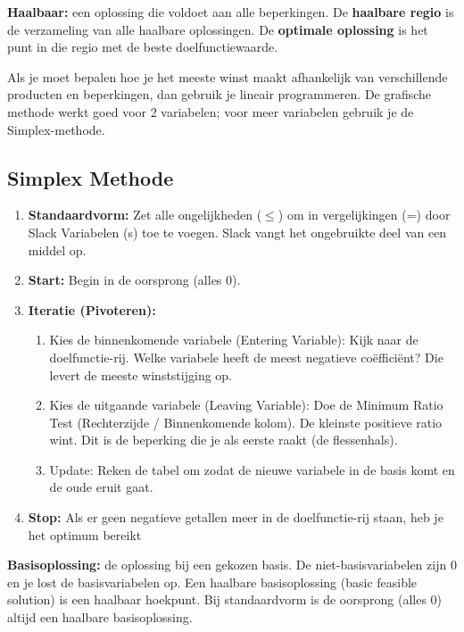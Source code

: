 \documentclass[a4paper,11pt]{article}
\begin{document}
\textbf{Haalbaar:} een oplossing die voldoet aan alle beperkingen. De \textbf{haalbare regio} is de verzameling van alle haalbare oplossingen. De \textbf{optimale oplossing} is het punt in die regio met de beste doelfunctiewaarde.

Als je moet bepalen hoe je het meeste winst
maakt afhankelijk van verschillende producten en beperkingen,
dan gebruik je lineair programmeren. De grafische methode werkt goed voor 2 variabelen;
voor meer variabelen gebruik je de Simplex-methode.

\subsection{Simplex Methode}

\begin{enumerate}
    \item \textbf{Standaardvorm:} Zet alle ongelijkheden ($\leq$) om in vergelijkingen (=) door Slack Variabelen (s) toe te voegen.
          Slack vangt het ongebruikte deel van een middel op.
    \item \textbf{Start:} Begin in de oorsprong (alles 0).
    \item \textbf{Iteratie (Pivoteren):}
          \begin{enumerate}
              \item Kies de binnenkomende variabele (Entering Variable): Kijk naar de doelfunctie-rij. Welke variabele heeft de meest negatieve coëfficiënt? Die levert de meeste winststijging op.
              \item Kies de uitgaande variabele (Leaving Variable): Doe de Minimum Ratio Test (Rechterzijde / Binnenkomende kolom). De kleinste positieve ratio wint. Dit is de beperking die je als eerste raakt (de flessenhals).
              \item Update: Reken de tabel om zodat de nieuwe variabele in de basis komt en de oude eruit gaat.
          \end{enumerate}
    \item \textbf{Stop:} Als er geen negatieve getallen meer in de doelfunctie-rij staan, heb je het optimum bereikt
\end{enumerate}

\textbf{Basisoplossing:} de oplossing bij een gekozen basis. De niet-basisvariabelen zijn 0 en je lost de basisvariabelen op. Een haalbare basisoplossing (basic feasible solution) is een haalbaar hoekpunt. Bij standaardvorm is de oorsprong (alles 0) altijd een haalbare basisoplossing.
\end{document}
